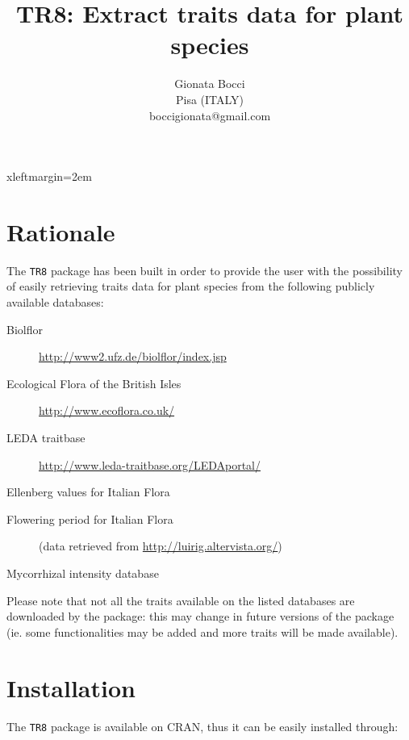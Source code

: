 \documentclass{article}
\title{TR8: Extract traits data for plant species}
\author{Gionata Bocci\\Pisa (ITALY)\\ {boccigionata@gmail.com}}
\begin{document}
\maketitle


 {xleftmargin=2em}
\renewenvironment{Schunk}{\vspace{\topsep}}{\vspace{\topsep}}


\section{Rationale}
\label{sec:rationale}




The \texttt{TR8} package has been built in order to provide the user with the
possibility of easily retrieving traits data for plant species from the following publicly available databases:

\begin{description}
\item[Biolflor] \url{http://www2.ufz.de/biolflor/index.jsp} \cite{biolflor}
\item[Ecological Flora of the British Isles] \url{http://www.ecoflora.co.uk/} \cite{ecoflora}
\item[LEDA traitbase] \url{http://www.leda-traitbase.org/LEDAportal/} \cite{leda}
\item[Ellenberg values for Italian Flora] \cite{pignatti}
\item[Flowering period for Italian Flora] \cite{pignatti} (data retrieved from \url{http://luirig.altervista.org/})
\item[Mycorrhizal intensity database] \cite{amf}

\end{description}

  Please note that not all the traits available on the listed
  databases are downloaded by the package: this may change in future
  versions of the package (ie. some functionalities may be added and
  more traits will be made available).

\section{Installation}
\label{sec:installation}
  
  The \texttt{TR8} package is available on CRAN, thus it can be easily installed through:
  
\end{document}
